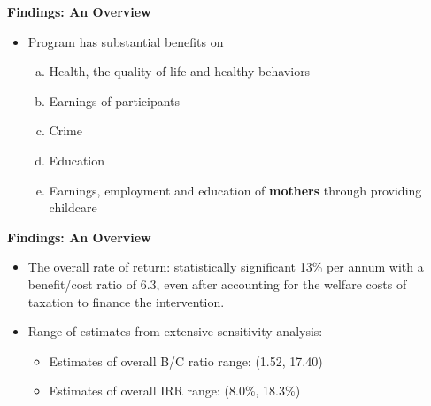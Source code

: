 \documentclass[static]{JJH-Beamer}
\begin{document}
\begin{frame}

\begin{center}
\textbf{Findings: An Overview}
\end{center}

\begin{itemize}
\item Program has substantial benefits on
    \begin{enumerate}[(a)]
    \item Health, the quality of life and healthy behaviors
    \item Earnings of participants
    \item Crime
    \item Education
    \item Earnings, employment and education of \textbf{mothers} through providing childcare
    \end{enumerate}
\end{itemize}

\end{frame}

\begin{frame}

\begin{center}
\textbf{Findings: An Overview}
\end{center}

\begin{itemize}
\item The overall rate of return: statistically significant 13\% per annum with a benefit/cost ratio of 6.3, even after accounting for the welfare costs of taxation to finance the intervention.
\item Range of estimates from extensive sensitivity analysis:
    \begin{itemize}
    \item Estimates of overall B/C ratio range: (1.52, 17.40)
    \item Estimates of overall IRR range: (8.0\%, 18.3\%)
    \end{itemize}
\end{itemize}

\end{frame}
\end{document}
